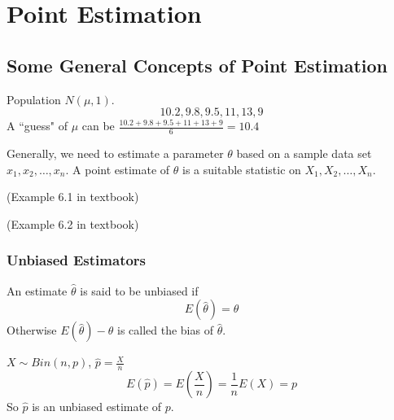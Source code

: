 \chapter{Point Estimation}
\section{Some General Concepts of Point Estimation}
\begin{exmp}
Population $N(\mu,1)$.
\[10.2, 9.8, 9.5, 11, 13, 9\]
A ``guess" of $\mu$ can be $\frac{10.2+9.8+9.5+11+13+9}{6}=10.4$
\end{exmp}

\begin{defn}
Generally, we need to estimate a parameter $\theta$ based on a sample data set $x_1,x_2,\dots,x_n$. A point estimate of $\theta$ is a suitable statistic on $X_1,X_2,\dots,X_n$.
\end{defn}

\begin{exmp}
(Example 6.1 in textbook)
\end{exmp}

\begin{exmp}
(Example 6.2 in textbook)
\end{exmp}

\subsection{Unbiased Estimators}
\begin{defn}
An estimate $\hat{\theta}$ is said to be unbiased if
\[E(\hat{\theta})=\theta\]
Otherwise $E(\hat{\theta})-\theta$ is called the bias of $\hat{\theta}$.
\end{defn}

\begin{exmp}
$X \sim Bin(n,p)$, $\hat{p}=\frac{X}{n}$
\[E(\hat{p})=E\left(\frac{X}{n}\right)=\frac{1}{n}E(X)=p\]
So $\hat{p}$ is an unbiased estimate of $p$.
\end{exmp}

